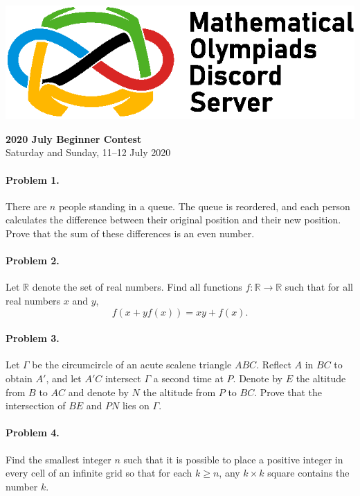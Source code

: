 \documentclass[12pt]{article}
\newcommand*{\currpos}[1]{%
  \zsavepos{#1}%
}
\begin{document}
		\begin{flushleft}
		\includegraphics[scale=0.7]{MODS_text_right.eps}\\
		\end{flushleft}
		\vspace{15pt}
		\noindent \LARGE\textbf{2020 July Beginner Contest}\\[10pt]
		\noindent \normalsize{Saturday and Sunday, 11--12 July 2020}\\
		\noindent \makebox[\linewidth]{\rule{\textwidth}{0.4pt}}
			
	\normalsize
	
	\paragraph{\currpos{one}Problem 1.} There are \(n\) people standing in a queue. The queue is reordered, and each person calculates the difference between their original position and their new position. Prove that the sum of these differences is an even number.
	
	\paragraph{\currpos{two}Problem 2.} Let \(\mathbb{R}\) denote the set of real numbers. Find all functions \(f: \mathbb{R} \to \mathbb{R}\) such that for all real numbers \(x\) and \(y\), \[f(x+yf(x)) = xy + f(x).\]
	
	\paragraph{\currpos{three}Problem 3.} Let \(\Gamma\) be the circumcircle of an acute scalene triangle \(ABC\). Reflect \(A\) in \(BC\) to obtain \(A'\), and let \(A'C\) intersect \(\Gamma\) a second time at \(P\). Denote by \(E\) the altitude from \(B\) to \(AC\) and denote by \(N\) the altitude from \(P\) to \(BC\). Prove that the intersection of \(BE\) and \(PN\) lies on \(\Gamma\).
	
	\paragraph{\currpos{four}Problem 4.} Find the smallest integer \(n\) such that it is possible to place a positive integer in every cell of an infinite grid so that for each \(k \geq n\), any \(k \times k\) square contains the number \(k\).
	
\end{document}

